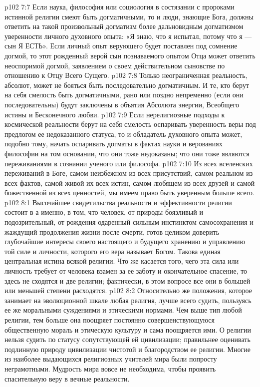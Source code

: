 \vs p102 7:7 \pc Если наука, философия или социология в состязании с пророками истинной религии смеют быть догматичными, то и люди, знающие Бога, должны ответить на такой произвольный догматизм более дальновидным догматизмом уверенности личного духовного опыта: «Я знаю, что я испытал, потому что я --- сын Я ЕСТЬ». Если личный опыт верующего будет поставлен под сомнение догмой, то этот рожденный верой сын познаваемого опытом Отца может ответить неоспоримой догмой, заявлением о своем действительном сыновстве по отношению к Отцу Всего Сущего.
\vs p102 7:8 Только неограниченная реальность, абсолют, может не бояться быть последовательно догматичным. И те, кто берут на себя смелость быть догматичными, рано или поздно непременно (если они последовательны) будут заключены в объятия Абсолюта энергии, Всеобщего истины и Бесконечного любви.
\vs p102 7:9 Если нерелигиозные подходы к космической реальности берут на себя смелость оспаривать уверенность веры под предлогом ее недоказанного статуса, то и обладатель духовного опыта может, подобно тому, начать оспаривать догматы в фактах науки и верованиях философии на том основании, что они тоже недоказаны; что они тоже являются переживаниями в сознании ученого или философа.
\vs p102 7:10 \pc Из всех вселенских переживаний в Боге, самом неизбежном из всех присутствий, самом реальном из всех фактов, самой живой их всех истин, самом любящем из всех друзей и самой божественной из всех ценностей, мы имеем право быть уверенным больше всего.
\vs p102 8:1 Высочайшее свидетильства реальности и эффективности религии состоит в  а именно, в том, что человек, от природы боязливый и подозрительный, от рождения одаренный сильным инстинктом самосохранения и жаждущий продолжения жизни после смерти, готов целиком доверить глубочайшие интересы своего настоящего и будущего хранению и управлению той силе и личности, которого его вера называет Богом. Такова единая центральная истина всякой религии. Что же касается того, чего эта сила или личность требует от человека взамен за ее заботу и окончательное спасение, то здесь не сходятся и две религии; фактически, в этом вопросе все они в большей или меньшей степени расходятся.
\vs p102 8:2 Относительно же положения, которое занимает на эволюционной шкале любая религия, лучше всего судить, пользуясь ее же моральными суждениями и этическими нормами. Чем выше тип любой религии, тем больше она поощряет постоянно совершенствующуюся общественную мораль и этическую культуру и сама поощряется ими. О религии нельзя судить по статусу сопутствующей ей цивилизации; правильнее оценивать подлинную природу цивилизации чистотой и благородством ее религии. Многие из наиболее выдающихся религиозных учителей мира были попросту неграмотными. Мудрость мира вовсе не необходима, чтобы проявить спасительную веру в вечные реальности.
